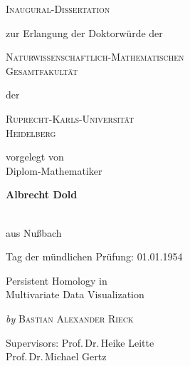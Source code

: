

\begin{titlepage}
	\begin{center}
		\textsc{\huge Inaugural-Dissertation}
                \vskip 1cm
                \begin{large}
                  zur Erlangung der Doktorwürde der\\[0.50cm]
                  \begin{Large}
                    \textsc{Naturwissenschaftlich-Mathematischen\\Gesamtfakultät}\\[0.50cm]
                  \end{Large}
                  der\\[0.50cm]
                  \begin{Large}
                    \textsc{Ruprecht-Karls-Universität\\Heidelberg}\par
                  \end{Large}
                \end{large}
		\vfill
		\begin{large}
                  vorgelegt von\\
                  Diplom-Mathematiker\\[0.5cm]
                  \begin{LARGE}
                    \textbf{Albrecht Dold}
                  \end{LARGE}\\[0.5cm]
                  aus Nu{\ss}bach
		\end{large}
    \vskip 1cm
    \begin{small}
      Tag der mündlichen Prüfung: 01.01.1954
    \end{small}
	\end{center}
\end{titlepage}


\begin{titlepage}
  \phantom{}
  \vfill 
  \begin{center}
    \begin{singlespace*}
      \begin{Huge}
          Persistent Homology in\\
          Multivariate Data Visualization\par
      \end{Huge}
      \vskip 0.25cm
      \emph{by}
      \vskip 0.25cm
      \textsc{Bastian Alexander Rieck}\par
    \end{singlespace*}
  \end{center}
  \vfill
  \begin{singlespace*}
    Supervisors:            Prof.\,Dr.\,Heike Leitte\\
    \phantom{Supervisors:}  Prof.\,Dr.\,Michael Gertz
  \end{singlespace*}
\end{titlepage}

\newpage
\null
\thispagestyle{empty}
\newpage

